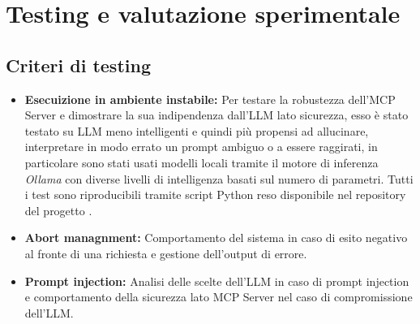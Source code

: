 \chapter{Testing e valutazione sperimentale}

\section{Criteri di testing}
\begin{itemize}
    \item \textbf{Esecuizione in ambiente instabile:} Per testare la robustezza dell'MCP Server e dimostrare la sua indipendenza dall'LLM lato sicurezza, esso è stato testato su LLM meno intelligenti e quindi più propensi ad allucinare, interpretare in modo errato un prompt ambiguo o a essere raggirati, in particolare sono stati usati modelli locali tramite il motore di inferenza \textit{Ollama} con diverse livelli di intelligenza basati sul numero di parametri. Tutti i test sono riproducibili tramite script Python reso disponibile nel repository del progetto \cite{repository_progetto}.
    \item \textbf{Abort managnment:} Comportamento del sistema in caso di esito negativo al fronte di una richiesta e gestione dell'output di errore.
    \item \textbf{Prompt injection:} Analisi delle scelte dell'LLM in caso di prompt injection e comportamento della sicurezza lato MCP Server nel caso di compromissione dell'LLM.
\end{itemize}


